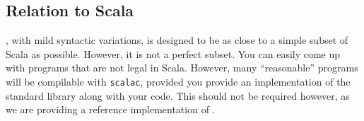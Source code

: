 \subsection{Relation to Scala}
\langname, with mild syntactic variations, is designed to be as close to a simple subset of Scala as possible.
However, it is not a perfect subset. You can easily come up with \langname programs
that are not legal in Scala.
However, many ``reasonable'' programs will be compilable with \lstinline{scalac},
provided you provide an implementation of the \langname standard library along with your code.
This should not be required however, as we are providing a reference implementation of \langname.

